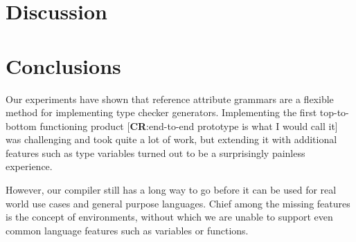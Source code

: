 \documentclass[nofilelist]{cslthse-msc}
\newcommand{\CR}[1]{\textcolor{green!60!black}{[\textbf{CR}:#1]}}
\begin{document}
\chapter{Discussion} %
\chapter{Conclusions} %
Our experiments have shown that reference attribute grammars are a flexible method for implementing type checker generators.
Implementing the first top-to-bottom functioning product \CR{end-to-end prototype is what I would call it} was challenging and took quite a lot of work, but extending it with additional features such as type variables turned out to be a surprisingly painless experience.

However, our compiler still has a long way to go before it can be used for real world use cases and general purpose languages.
Chief among the missing features is the concept of environments, without which we are unable to support even common language features such as variables or functions.

\end{document}
